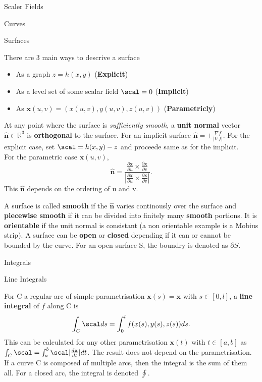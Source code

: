 \documentclass[12pt, letterpaper]{article}
\newcommand{\x}{\textbf{x}}
\newcommand{\norm}{\hat{\textbf{n}}}
\newcommand{\R}{\mathbb{R}}
\newcommand{\pder}[2]{\frac{\partial{} #1}{\partial{} #2}}
\newcommand{\der}[2]{\frac{d #1}{d #2}}
\begin{document}
\begin{section}{Scaler Fields}
\begin{subsection}{Curves}
  \end{subsection}

  \begin{subsection}{Surfaces}

    There are 3 main ways to descrive a surface
    \begin{itemize}
      \item As a graph \(z = h(x, y)\) (\textbf{Explicit})
      \item As a level set of some scalar field \(\scal = 0\)
            (\textbf{Implicit})
      \item As \(\x(u, v) = (x(u, v), y(u, v), z(u, v))\)
            (\textbf{Parametricly})
    \end{itemize}

    At any point where the surface is \textit{sufficiently smooth}, a
    \textbf{unit normal} vector \(\norm \in \R^{3}\) is \textbf{orthogonal} to
    the surface. For an implicit surface \(\norm = \pm
    \frac{\nabla f}{| \nabla f |}\). For the explicit case, set \(\scal =
    h(x, y) - z\) and proceede same as for the implicit. \\
    For the parametric case \(\x(u, v)\), \[\norm = \frac{\pder{\x}{u} \times
        \pder{\x}{v}}{ | \pder{\x}{u} \times \pder{\x}{v} | }.\]
    This \(\norm\) depends on the ordering of u and v.

    A surface is called \textbf{smooth} if the \(\norm\) varies continously
    over the surface and \textbf{piecewise smooth} if it can be divided into
    finitely many \textbf{smooth} portions. It is \textbf{orientable} if the
    unit normal is consistant (a non orientable example is a Mobius strip).
    A surface can be \textbf{open} or \textbf{closed} depending if it can or
    cannot be bounded by the curve. For an open surface S, the boundry is
    denoted as \(\partial S\).

  \end{subsection}

  \begin{subsection}{Integrals}

    \begin{subsubsection}{Line Integrals}

      For C a regular arc of simple parametrisation \(\x(s) =
      \x\) with \(s \in [0, l]\), a \textbf{line integral} of \(f\) along
      C is \[\int_{C} \scal ds = \int^{l}_{0} f(x(s), y(s), z(s)) ds.\] This can
      be calculated for any other parametrisation \(\x(t)\) with
      \(t \in [a, b]\) as \(\int_{C} \scal = \int^{b}_{a} \scal
      | \der{\x}{t} | dt\). The result does not depend on the
      parametrisation. If a curve C is composed of multiple arcs, then the
      integral is the sum of them all. For a closed arc, the integral is denoted
      \(\oint\).


\end{subsubsection}
\end{subsection}
\end{section}
\end{document}

